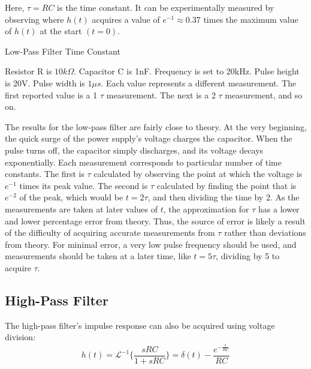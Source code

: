 Here, $\tau = RC$ is the time constant. It can be experimentally measured by observing where $h(t)$ acquires a value of $e^{-1} \approx 0.37$ times the maximum value of $h(t)$ at the start $(t = 0)$.


\FloatBarrier

\begin{table}[h!]
\centering
\caption{Low-Pass Filter Time Constant}
\label{tab:lpf_tau}
\end{table}
{\footnotesize Resistor R is $10k\Omega$. Capacitor C is 1nF. Frequency is set to 20kHz. Pulse height is 20V. Pulse width is $1\mu s$. Each value represents a different measurement. The first reported value is a 1 $\tau$ measurement. The next is a 2 $\tau$ measurement, and so on.} \\
\FloatBarrier

The results for the low-pass filter are fairly close to theory. At the very beginning, the quick surge of the power supply's voltage charges the capacitor. When the pulse turns off, the capacitor simply discharges, and its voltage decays exponentially.
Each measurement corresponds to particular number of time constants. The first is $\tau$ calculated by observing the point at which the voltage is $e^{-1}$ times its peak value. The second is $\tau$ calculated by finding the point that is $e^{-2}$ of the peak, which would be $t = 2\tau$, and then dividing the time by 2. As the measurements are taken at later values of $t$, the approximation for $\tau$ has a lower and lower percentage error from theory. Thus, the source of error is likely a result of the difficulty of acquiring accurate measurements from $\tau$ rather than deviations from theory. For minimal error, a very low pulse frequency should be used, and measurements should be taken at a later time, like $t=5\tau$, dividing by 5 to acquire $\tau$.

\subsection{High-Pass Filter}
The high-pass filter's impulse response can also be acquired using voltage division:
\begin{equation}
	\label{eq:ir_hpf}
	h(t) = \mathcal{L}^{-1}\{ \frac{ sRC }{ 1 + sRC } \} = \delta(t) - \frac{ e^{- \frac{t}{RC} } }{RC}
\end{equation}

